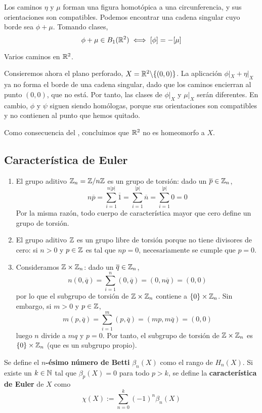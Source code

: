 Los caminos $\eta$ y $\mu$ forman una figura homotópica a una circunferencia, y sus orientaciones son compatibles.
Podemos encontrar una cadena singular cuyo borde sea $\phi+\mu$. Tomando clases,
	\[\phi+\mu \in B_1(\mathbb{R}^2) \iff [\phi]=-[\mu]\]

\begin{marginfigure}
	
	\caption{Varios caminos en $\mathbb{R}^2$.}
\end{marginfigure}

Consieremos ahora el plano perforado, $X=\mathbb{R}^2\backslash\{(0,0)\}$.
La aplicación $\phi|_X+\eta|_X$ ya no forma el borde de una cadena singular, dado que los caminos encierran al punto $(0,0)$, que no está.
Por tanto, las clases de $\phi|_X$ y $\mu|_X$ serán diferentes.
En cambio, $\phi$ y $\psi$ siguen siendo homólogas, porque sus orientaciones son compatibles y no contienen al punto que hemos quitado.

Como consecuencia del , concluimos que $\mathbb{R}^2$ no es homeomorfo a $X$.

\subsection{Característica de Euler}

\begin{example}
\begin{enumerate}
	\item El grupo aditivo $\mathbb{Z}_n=\mathbb{Z}/n\mathbb{Z}$ es un grupo de torsión: dado un $\overline{p} \in \mathbb{Z}_n$,
		\[n\overline{p}=\sum^{n|p|}_{i=1}\overline{1}=\sum^{|p|}_{i=1}\overline{n}=\sum^{|p|}_{i=1}0=0\]
	Por la misma razón, todo cuerpo de característica mayor que cero define un grupo de torsión.
	\item El grupo aditivo $\mathbb{Z}$ es un grupo libre de torsión porque no tiene divisores de cero: si $n > 0$ y $p \in \mathbb{Z}$ es tal que $np=0$, necesariamente se cumple que $p=0$.
	\item Consideramos $\mathbb{Z}\times \mathbb{Z}_n$: dado un $\overline{q} \in \mathbb{Z}_n$,
		\[n(0,\overline{q})=\sum^n_{i=1}(0,\overline{q})=(0,n\overline{q})=(0,0)\]
	por lo que el subgrupo de torsión de $\mathbb{Z}\times \mathbb{Z}_n$ contiene a $\{0\}\times\mathbb{Z}_n$.
	Sin embargo, si $m > 0$ y $p \in \mathbb{Z}$,
		\[m(p,\overline{q})=\sum^m_{i=1}(p,\overline{q})=(mp,m\overline{q})=(0,0)\]
	luego $n$ divide a $mq$ y $p=0$.
	Por tanto, el subgrupo de torsión de $\mathbb{Z}\times \mathbb{Z}_n$ es $\{0\}\times\mathbb{Z}_n$ (que es un subgrupo propio).
\end{enumerate}
\end{example}

\begin{definition}
Se define el \textbf{$n$-ésimo número de Betti} $\beta_n(X)$ como el rango de $H_n(X)$.
Si existe un $k \in \mathbb{N}$ tal que $\beta_p(X)=0$ para todo $p > k$, se define la \textbf{característica de Euler} de $X$ como 
	\[\chi(X):=\sum^k_{n=0}(-1)^n\beta_n(X)\]
\end{definition}
